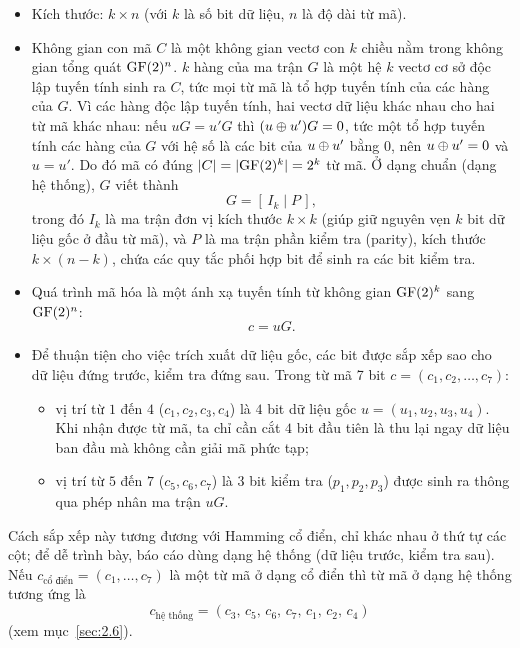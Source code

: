 \begin{itemize}
  \item Kích thước: $k \times n$ (với $k$ là số bit dữ liệu, $n$ là độ dài từ
        mã).
  \item Không gian con mã $C$ là một không gian vectơ con $k$ chiều nằm trong
        không gian tổng quát $\mathrm{GF}(2)^{n}$. $k$ hàng của ma trận $G$ là một hệ $k$
        vectơ cơ sở độc lập tuyến tính sinh ra $C$, tức mọi từ mã là tổ hợp
        tuyến tính của các hàng của $G$. Vì các hàng độc lập tuyến tính, hai
        vectơ dữ liệu khác nhau cho hai từ mã khác nhau: nếu $uG = u'G$ thì
        $(u \oplus u')G = 0$, tức một tổ hợp tuyến tính các hàng của $G$ với hệ
        số là các bit của $u \oplus u'$ bằng $0$, nên $u \oplus u' = 0$ và
        $u = u'$. Do đó mã có đúng
        $\lvert C \rvert = \lvert \mathrm{GF}(2)^{k} \rvert = 2^k$ từ mã. Ở dạng chuẩn
        (dạng hệ thống), $G$ viết thành
        \[
          G = [\,I_k \mid P\,],
        \]
        trong đó $I_k$ là ma trận đơn vị kích thước $k \times k$ (giúp giữ
        nguyên vẹn $k$ bit dữ liệu gốc ở đầu từ mã), và $P$ là ma trận phần
        kiểm tra (parity), kích thước $k \times (n-k)$, chứa các quy tắc phối
        hợp bit để sinh ra các bit kiểm tra.
  \item Quá trình mã hóa là một ánh xạ tuyến tính từ không gian $\mathrm{GF}(2)^{k}$ sang
        $\mathrm{GF}(2)^{n}$:
        \begin{equation}\label{eq:mahoa}
          c = u G .
        \end{equation}
  \item Để thuận tiện cho việc trích xuất dữ liệu gốc, các bit được sắp xếp
        sao cho dữ liệu đứng trước, kiểm tra đứng sau. Trong từ mã 7 bit
        $c = (c_1, c_2, \dots, c_7)$:
        \begin{itemize}
          \item vị trí từ $1$ đến $4$ ($c_1, c_2, c_3, c_4$) là $4$ bit dữ liệu
                gốc $u = (u_1, u_2, u_3, u_4)$. Khi nhận được từ mã, ta chỉ
                cần cắt $4$ bit đầu tiên là thu lại ngay dữ liệu ban đầu mà
                không cần giải mã phức tạp;
          \item vị trí từ $5$ đến $7$ ($c_5, c_6, c_7$) là $3$ bit kiểm tra
                ($p_1, p_2, p_3$) được sinh ra thông qua phép nhân ma trận
                $uG$.
        \end{itemize}
\end{itemize}

Cách sắp xếp này tương đương với Hamming cổ điển, chỉ khác nhau ở thứ tự các
cột; để dễ trình bày, báo cáo dùng dạng hệ thống (dữ liệu trước, kiểm tra
sau). Nếu $c_{\text{cổ điển}} = (c_1, \dots, c_7)$ là một từ mã ở dạng cổ
điển thì từ mã ở dạng hệ thống tương ứng là
\begin{equation}\label{eq:hoanvi-1}
  c_{\text{hệ thống}} = (c_3,\,c_5,\,c_6,\,c_7,\,c_1,\,c_2,\,c_4)
\end{equation}
(xem mục~\ref{sec:2.6}).

